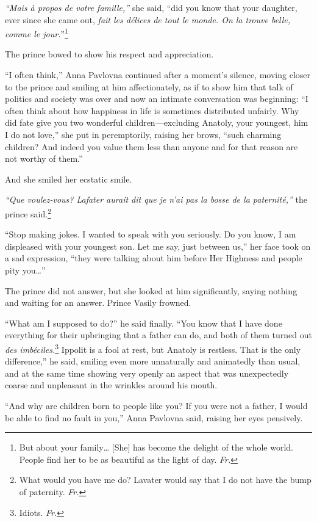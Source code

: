 \textit{``Mais \`a propos de votre famille,''} she said, ``did you know that your daughter, ever since she came out, \textit{fait les d\'elices de tout le monde. On la trouve belle, comme le jour.}''\footnote{But about your family\ldots{} [She] has become the delight of the whole world. People find her to be as beautiful as the light of day. \textit{Fr.}} %

The prince bowed to show his respect and appreciation.

``I often think,'' Anna Pavlovna continued after a moment's silence, moving closer to the prince and smiling at him affectionately, as if to show him that talk of politics and society was over and now an intimate conversation was beginning: ``I often think about how happiness in life is sometimes distributed unfairly. Why did fate give you two wonderful children---excluding Anatoly, your youngest, him I do not love,'' she put in peremptorily, raising her brows, ``such charming children? And indeed you value them less than anyone and for that reason are not worthy of them.'' %

And she smiled her ecstatic smile.

\textit{``Que voulez-vous? Lafater aurait dit que je n'ai pas la bosse de la paternit\'e,''} the prince said.\footnote{What would you have me do? Lavater would say that I do not have the bump of paternity. \textit{Fr.}} %

``Stop making jokes. I wanted to speak with you seriously. Do you know, I am displeased with your youngest son. Let me say, just between us,'' her face took on a sad expression, ``they were talking about him before Her Highness and people pity you\ldots{}'' %

The prince did not answer, but she looked at him significantly, saying nothing and waiting for an answer. Prince Vasily frowned.

``What am I supposed to do?'' he said finally. ``You know that I have done everything for their upbringing that a father can do, and both of them turned out \textit{des imb\'eciles.}\footnote{Idiots. \textit{Fr.}} Ippolit is a fool at rest, but Anatoly is restless. That is the only difference,'' he said, smiling even more unnaturally and animatedly than usual, and at the same time showing very openly an aspect that was unexpectedly coarse and unpleasant in the wrinkles around his mouth. %

``And why are children born to people like you? If you were not a father, I would be able to find no fault in you,'' Anna Pavlovna said, raising her eyes pensively. %

